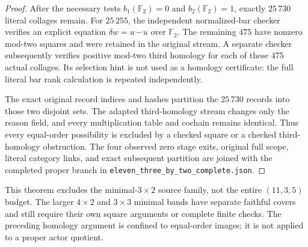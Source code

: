 \begin{proof}
After the necessary tests $b_1(\mathbb F_2)=0$ and
$b_2(\mathbb F_2)=1$, exactly $25\,730$ literal collages
remain.  For $25\,255$, the independent normalized-bar
checker verifies an explicit equation
$\delta w=u\smile u$ over $\mathbb F_2$.  The remaining
$475$ have nonzero mod-two squares and were retained in
the original stream.  A separate checker subsequently
verifies positive mod-two third homology for each of
these $475$ actual collages.  Its selection hint is not
used as a homology certificate: the full literal bar
rank calculation is repeated independently.

The exact original record indices and hashes partition
the $25\,730$ records into those two disjoint sets.  The
adapted third-homology stream changes only the reason
field, and every multiplication table and cochain remains
identical.  Thus every equal-order possibility is excluded
by a checked square or a checked third-homology obstruction.
The four observed zero stage exits, original full scope,
literal category links, and exact subsequent partition
are joined with the completed proper branch in
\texttt{eleven\_three\_by\_two\_complete.json}.
\end{proof}

\begin{remark*}
This theorem excludes the minimal-$3\times2$ source
family, not the entire $(11,3,5)$ budget.  The larger
$4\times2$ and $3\times3$ minimal bands have separate
faithful covers and still require their own square
arguments or complete finite checks.  The preceding
homology argument is confined to equal-order images;
it is not applied to a proper actor quotient.
\end{remark*}
